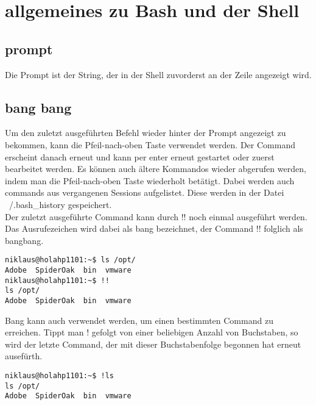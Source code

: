 \section{allgemeines zu Bash und der Shell}
\subsection{prompt}
Die Prompt ist der String, der in der Shell zuvorderst an der Zeile angezeigt wird.
\subsection{bang bang}
Um den zuletzt ausgef\"uhrten Befehl wieder hinter der Prompt angezeigt zu bekommen, kann die Pfeil-nach-oben Taste verwendet werden. Der Command erscheint danach erneut und kann per enter erneut gestartet oder zuerst bearbeitet werden. Es k\"onnen auch \"altere Kommandos wieder abgerufen werden, indem man die Pfeil-nach-oben Taste wiederholt bet\"atigt. Dabei werden auch commands aus vergangenen Sessions aufgelistet. Diese werden in der Datei ~/.bash\_history gespeichert.\\
Der zuletzt ausgef\"uhrte Command kann durch !! noch einmal ausgef\"uhrt werden. Das Ausrufezeichen wird dabei als bang bezeichnet, der Command !! folglich als bangbang.
\begin{lstlisting}
niklaus@holahp1101:~$ ls /opt/
Adobe  SpiderOak  bin  vmware
niklaus@holahp1101:~$ !!
ls /opt/
Adobe  SpiderOak  bin  vmware
\end{lstlisting}
Bang kann auch verwendet werden, um einen bestimmten Command zu erreichen. Tippt man ! gefolgt von einer beliebigen Anzahl von Buchstaben, so wird der letzte Command, der mit dieser Buchstabenfolge begonnen hat erneut ausef\"urth.
\begin{lstlisting}
niklaus@holahp1101:~$ !ls
ls /opt/
Adobe  SpiderOak  bin  vmware
\end{lstlisting}
